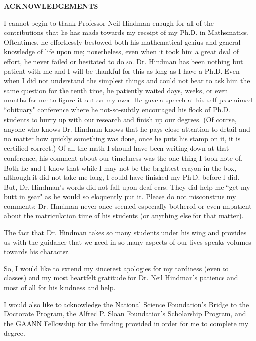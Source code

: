 \documentclass[12pt]{report}
\theoremstyle{definition}
\renewcommand{\baselinestretch}{1.5}\small\normalsize
\begin{document}
\renewcommand{\baselinestretch}{1.5}\small\normalsize\bigskip

\newpage
\begin{center}
{\bf ACKNOWLEDGEMENTS}
\end{center}

I cannot begin to thank Professor Neil Hindman enough for 
all of the contributions that he has made towards my receipt
of my Ph.D. in Mathematics.  Oftentimes, he effortlessly 
bestowed both his mathematical genius and general knowledge 
of life upon me; nonetheless, even when it took him a great
deal of effort, he never failed or hesitated to do so.  Dr.
Hindman has been nothing but patient with me and I will be 
thankful for this as long as I have a Ph.D.  Even when I 
did not understand the simplest things and could not bear to
ask him the same question for the tenth time, he patiently 
waited days, weeks, or even months for me to figure it out on my
own.  He gave a 
speech at his self-proclaimed ``obituary" conference where
he not-so-subtly encouraged his flock of Ph.D. students to
hurry up with our research and finish up our degrees.  (Of
course, anyone who knows Dr. Hindman knows that he pays close
attention to detail and no matter how quickly something was
done, once he puts his stamp on it, it is certified correct.)     
Of all the math I should have been writing down at that 
conference, his comment about our timeliness was the one 
thing I took note of.  Both he and I know that while I may 
not be the brightest crayon in the box, although it did not 
take me long, I could have finished my Ph.D. before I did.  But, 
Dr. Hindman's words did not fall upon deaf ears.  They did 
help me ``get my butt in gear" as he would so eloquently 
put it.  Please do not misconstrue my comments:  Dr. Hindman 
never once seemed especially bothered or even impatient 
about the matriculation time of his students (or anything
else for that matter).
      
The fact that Dr. Hindman takes so many students under his 
wing and provides us with the guidance that we need in so
many aspects of our lives speaks volumes towards his character.

So, I would like to extend my sincerest apologies for my
tardiness (even to classes) and my most heartfelt 
gratitude for Dr. Neil Hindman's patience and most of all 
for his kindness and help.

I would also like to acknowledge the National Science Foundation's
Bridge to the Doctorate Program, the Alfred P. Sloan Foundation's
Scholarship Program, and the GAANN Fellowship for the funding
provided in order for me to complete my degree.
\end{document}
